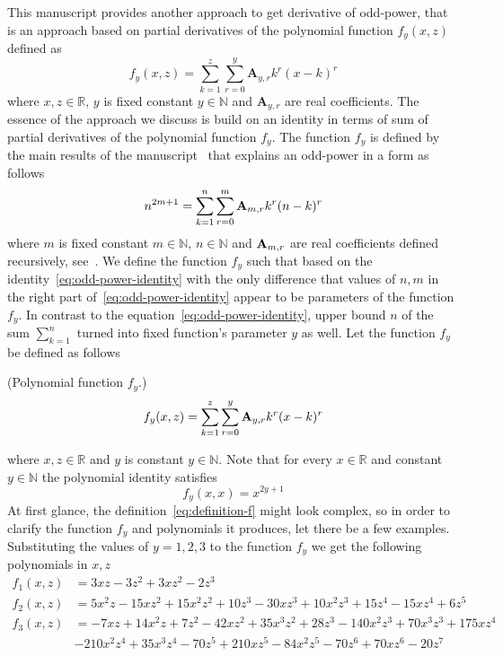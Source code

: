 This manuscript provides another approach to get derivative of odd-power,
that is an approach based on partial derivatives of the polynomial function $f_y(x,z)$ defined as
\[
    f_{y} (x, z) = \sum_{k=1}^{z} \sum_{r=0}^{y} \mathbf{A}_{y,r} k^r (x-k)^r
\]
where $x, z\in \mathbb{R}$, $y$ is fixed constant $y \in \mathbb{N}$ and $\mathbf{A}_{y,r}$ are real coefficients.
The essence of the approach we discuss is build
on an identity in terms of sum of partial derivatives of the polynomial function $f_{y}$.
The function $f_{y}$ is defined by the main results of the manuscript~\cite{kolosov_2022}
that explains an odd-power in a form as follows
\begin{equation}
    n^{2m+1} = \sum_{k=1}^{n} \sum_{r=0}^{m} {\mathbf{A}} \sb{m,r} k^r (n-k)^r
    \label{eq:odd-power-identity}
\end{equation}
where $m$ is fixed constant $m\in\mathbb{N}$, $n \in \mathbb{N}$ and ${\mathbf{A}} \sb{m,r}$ are real coefficients defined
recursively, see~\cite{kolosov2016link}.
We define the function $f_{y}$ such that based on the identity~\eqref{eq:odd-power-identity}
with the only difference that values of $n, m$ in the right part of~\eqref{eq:odd-power-identity}
appear to be parameters of the function $f_{y}$.
In contrast to the equation~\eqref{eq:odd-power-identity}, upper bound $n$ of the sum $\sum_{k=1}^{n}$ turned into fixed
function's parameter $y$ as well.
Let the function $f_{y}$ be defined as follows
\begin{definition} (Polynomial function $f_{y}$.)
    \begin{equation}
        f_{y} (x, z) = \sum_{k=1}^{z} \sum_{r=0}^{y} {\mathbf{A}} \sb{y,r} k^r (x-k)^r
        \label{eq:definition-f}
    \end{equation}
\end{definition}
where $x, z\in \mathbb{R}$ and $y$ is constant $y \in \mathbb{N}$.
Note that for every $x\in\mathbb{R}$ and constant $y\in\mathbb{N}$ the polynomial identity satisfies
\begin{equation*}
    f_{y} (x, x) = x^{2y+1}
\end{equation*}
At first glance, the definition~\eqref{eq:definition-f} might look complex, so in order to clarify
the function $f_y$ and polynomials it produces, let there be a few examples.
Substituting the values of $y=1,2,3$ to the function $f_y$ we get the following polynomials in $x, z$
\begin{align*}
    f_{1} (x, z) &= 3 x z - 3 z^2 + 3 x z^2 - 2 z^3 \\
    f_{2} (x, z) &= 5 x^2 z - 15 x z^2 + 15 x^2 z^2 + 10 z^3 - 30 x z^3 + 10 x^2 z^3 +
    15 z^4 - 15 x z^4 + 6 z^5 \\
    f_{3} (x, z) &= -7 x z + 14 x^2 z + 7 z^2 - 42 x z^2 + 35 x^3 z^2 + 28 z^3 - 140 x^2 z^3 + 70 x^3 z^3 + 175 x z^4 \\
    &- 210 x^2 z^4 + 35 x^3 z^4 - 70 z^5 + 210 x z^5 - 84 x^2 z^5 - 70 z^6 + 70 x z^6 - 20 z^7
\end{align*}
